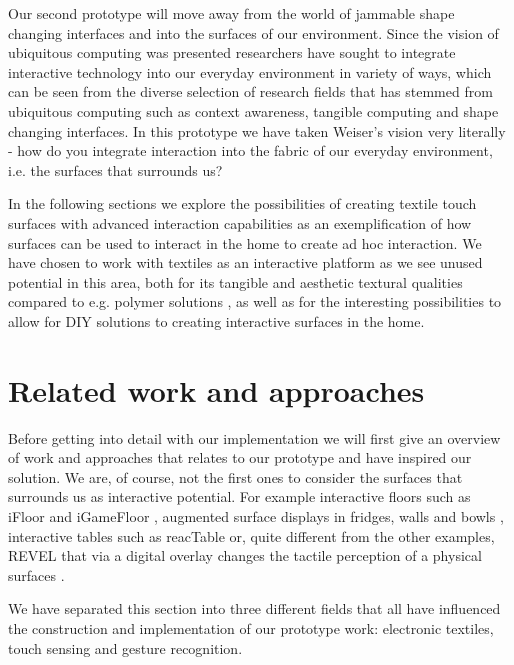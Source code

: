 Our second prototype will move away from the world of jammable shape changing interfaces and into the surfaces of our environment.
Since the vision of ubiquitous computing was presented researchers have sought to integrate interactive technology into our everyday environment in variety of ways, which can be seen from the diverse selection of research fields that has stemmed from ubiquitous computing such as context awareness, tangible computing and shape changing interfaces.
In this prototype we have taken Weiser's vision very literally - how do you integrate interaction into the fabric of our everyday environment, i.e. the surfaces that surrounds us?

In the following sections we explore the possibilities of creating textile touch surfaces with advanced interaction capabilities as an exemplification of how surfaces can be used to interact in the home to create ad hoc interaction.
We have chosen to work with textiles as an interactive platform as we see unused potential in this area, both for its tangible and aesthetic textural qualities compared to e.g. polymer solutions \cite{rosenberg2009unmousepad}, as well as for the interesting possibilities to allow for DIY solutions to creating interactive surfaces in the home.


\section{Related work and approaches}
Before getting into detail with our implementation we will first give an overview of work and approaches that relates to our prototype and have inspired our solution.
We are, of course, not the first ones to consider the surfaces that surrounds us as interactive potential.
For example interactive floors such as iFloor \citep{petersen2005floor} and  iGameFloor \citep{gronbaek2007igamefloor}, augmented surface displays in fridges, walls and bowls \citep{taylor2007homes}, interactive tables such as reacTable \citep{jorda2007reactable} or, quite different from the other examples, REVEL that via a digital overlay changes the tactile perception of a physical surfaces \citep{bau2013revel}.

We have separated this section into three different fields that all have influenced the construction and implementation of our prototype work: electronic textiles, touch sensing and gesture recognition.
 
